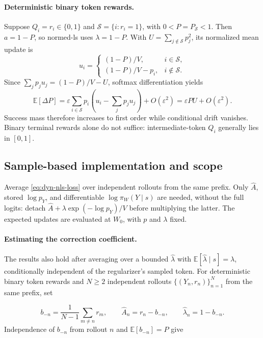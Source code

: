\paragraph{Deterministic binary token rewards.}
Suppose $Q_i=r_i\in\{0,1\}$ and
$\mathcal S=\{i:r_i=1\}$, with $0<P=P_{\mathcal S}<1$.
Then $a=1-P$, so normed-ls uses $\lambda=1-P$. With
$U=\sum_{j\notin\mathcal S}p_j^2$, its normalized mean update is
\[
 u_i=\begin{cases}
 (1-P)/V,&i\in\mathcal S,\\
 (1-P)/V-p_i,&i\notin\mathcal S.
 \end{cases}
\]
Since $\sum_jp_ju_j=(1-P)/V-U$, softmax differentiation yields
\begin{equation}
 \mathbb E[\Delta P]
 =\varepsilon\sum_{i\in\mathcal S}p_i
       \left(u_i-\sum_jp_ju_j\right)+O(\varepsilon^2)
 =\varepsilon PU+O(\varepsilon^2).
 \label{eq:dyn-nls-success}
\end{equation}
Success mass therefore increases to first order while conditional drift
vanishes. Binary terminal rewards alone do not suffice: intermediate-token
$Q_i$ generally lies in $[0,1]$.

\subsection{Sample-based implementation and scope}
\label{app:dynamics-implementation}

Average \eqref{eq:dyn-nls-loss} over independent rollouts from the same
prefix. Only $\widehat A$, stored $\log p_Y$, and differentiable
$\log\pi_W(Y\mid s)$ are needed, without the full logits: detach
$\widehat A+\lambda\exp(-\log p_Y)/V$ before multiplying the latter.
The expected updates are evaluated at $W_0$, with $p$ and $\lambda$ fixed.

\paragraph{Estimating the correction coefficient.}
The results also hold after averaging over a bounded
$\widehat\lambda$ with $\mathbb E[\widehat\lambda\mid s]=\lambda$,
conditionally independent of the regularizer's sampled token.
For deterministic binary token rewards and $N\ge2$ independent rollouts
$\{(Y_n,r_n)\}_{n=1}^N$ from the same prefix, set

\begin{equation}
 b_{-n}=\frac{1}{N-1}\sum_{m\ne n}r_m,\qquad
 \widehat A_n=r_n-b_{-n},\qquad
 \widehat\lambda_n=1-b_{-n}.
 \label{eq:dyn-loo}
\end{equation}
Independence of $b_{-n}$ from rollout $n$ and $\mathbb E[b_{-n}]=P$ give

